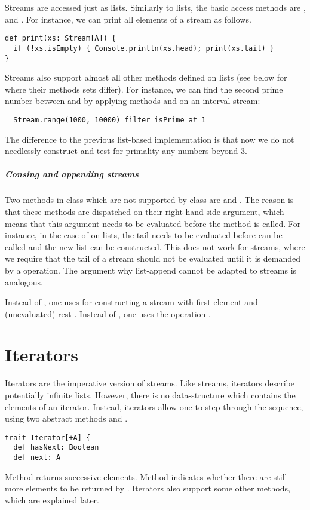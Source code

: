 {Streams are accessed just as lists. Similarly to lists, the basic access
methods are ,  and . For instance,
we can print all elements of a stream as follows.
\begin{lstlisting}
def print(xs: Stream[A]) {
  if (!xs.isEmpty) { Console.println(xs.head); print(xs.tail) }
}
\end{lstlisting}
Streams also support almost all other methods defined on lists (see
below for where their methods sets differ). For instance, we can find
the second prime number between  and  by applying methods
 and  on an interval stream:
\begin{lstlisting}
  Stream.range(1000, 10000) filter isPrime at 1
\end{lstlisting}
The difference to the previous list-based implementation is that now
we do not needlessly construct and test for primality any numbers
beyond 3.

\paragraph{Consing and appending streams} Two methods in class 
which are not supported by class  are \code{::} and
\code{:::}.  The reason is that these methods are dispatched on their
right-hand side argument, which means that this argument needs to be
evaluated before the method is called. For instance, in the case of
 on lists, the tail  needs to be evaluated
before \code{::} can be called and the new list can be constructed.
This does not work for streams, where we require that the tail of a
stream should not be evaluated until it is demanded by a  operation.
The argument why list-append \code{:::} cannot be adapted to streams is analogous.

Instead of , one uses  for
constructing a stream with first element  and (unevaluated)
rest .  Instead of , one uses the operation
.  

\chapter{Iterators}

Iterators are the imperative version of streams. Like streams,
iterators describe potentially infinite lists. However, there is no
data-structure which contains the elements of an iterator. Instead, 
iterators allow one to step through the sequence, using two abstract methods  and .
\begin{lstlisting}
trait Iterator[+A] {
  def hasNext: Boolean
  def next: A
\end{lstlisting}
Method  returns successive elements.  Method 
indicates whether there are still more elements to be returned by
. Iterators also support some other methods, which are
explained later.

}
